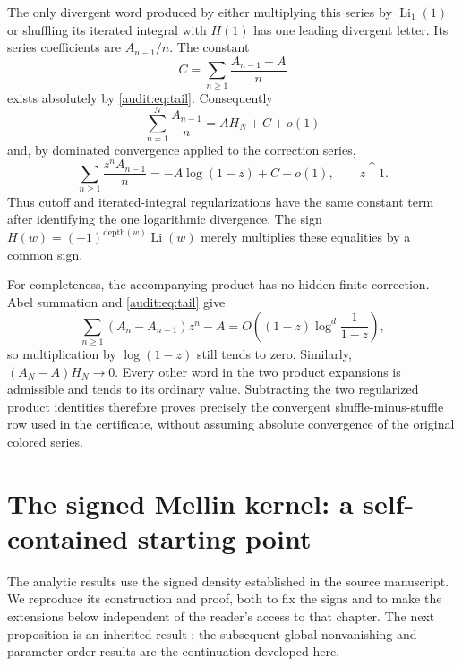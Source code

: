 \documentclass[11pt]{article}
\numberwithin{equation}{section}
\theoremstyle{plain}
\theoremstyle{definition}
\theoremstyle{remark}
\DeclareMathOperator{\Li}{Li}
\begin{document}
The only divergent word produced by either multiplying this series by
$\Li_1(1)$ or shuffling its iterated integral with $H(1)$ has one
leading divergent letter. Its series coefficients are $A_{n-1}/n$.
The constant
\[
 C=\sum_{n\ge1}\frac{A_{n-1}-A}{n}
\]
exists absolutely by \eqref{audit:eq:tail}. Consequently
\[
 \sum_{n=1}^N\frac{A_{n-1}}n=A H_N+C+o(1)
\]
and, by dominated convergence applied to the correction series,
\[
 \sum_{n\ge1}\frac{z^nA_{n-1}}n
   =-A\log(1-z)+C+o(1),\qquad z\uparrow1.
\]
Thus cutoff and iterated-integral regularizations have the same constant
term after identifying the one logarithmic divergence. The sign
$H(w)=(-1)^{\mathrm{depth}(w)}\Li(w)$ merely multiplies these equalities
by a common sign.

For completeness, the accompanying product has no hidden finite
correction. Abel summation and \eqref{audit:eq:tail} give
\[
 \sum_{n\ge1}(A_n-A_{n-1})z^n-A
 =O\!\left((1-z)\log^d\frac1{1-z}\right),
\]
so multiplication by $\log(1-z)$ still tends to zero. Similarly,
$(A_N-A)H_N\to0$. Every other word in the two product expansions is
admissible and tends to its ordinary value. Subtracting the two
regularized product identities therefore proves precisely the
convergent shuffle-minus-stuffle row used in the certificate, without
assuming absolute convergence of the original colored series.


\section{The signed Mellin kernel: a self-contained starting point}
\label{sec:signed-foundation}

The analytic results use the signed density established in the source
manuscript. We reproduce its construction and proof, both to fix the signs
and to make the extensions below independent of the reader's access to
that chapter. The next proposition is an inherited result \cite{ProveIt};
the subsequent global nonvanishing and parameter-order results are the
continuation developed here.
\end{document}
